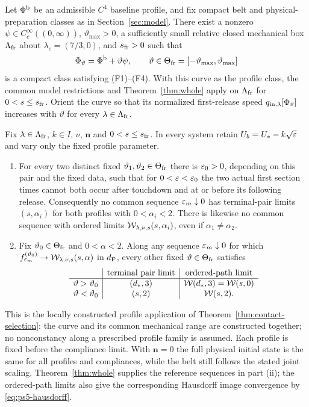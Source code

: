 \begin{corollary}
\label{cor:friction-profile-selection}
Let $\Phi^{\rm b}$ be an admissible $C^4$ baseline profile, and fix
compact belt and physical-preparation classes as in
Section~\ref{sec:model}. There exist a nonzero
$\psi\in C_c^\infty((0,\infty))$, $\vartheta_{\max}>0$, a
sufficiently small relative closed mechanical box $\Lambda_{\rm fr}$
about $\lambda_c=(7/3,0)$, and $s_{\rm fr}>0$ such that
\[
 \Phi_\vartheta=\Phi^{\rm b}+\vartheta\psi,\qquad
 \vartheta\in\Theta_{\rm fr}
              =[-\vartheta_{\max},\vartheta_{\max}]
\]
is a compact class satisfying (F1)--(F4). With this curve as the
profile class, the common model restrictions and
Theorem~\ref{thm:whole} apply on $\Lambda_{\rm fr}$ for
$0<s\le s_{\rm fr}$. Orient the curve so that its normalized
first-release speed $q_{\rm in,\lambda}[\Phi_\vartheta]$ increases with
$\vartheta$ for every $\lambda\in\Lambda_{\rm fr}$.

Fix $\lambda\in\Lambda_{\rm fr}$, $k\in I$, $\nu$, $\mathbf n$
and $0<s\le s_{\rm fr}$. In every system retain
$U_b=U_*-k\sqrt{\varepsilon}$ and vary only the fixed profile parameter.
\begin{enumerate}[label=\textup{(\roman*)},leftmargin=*]
\item For every two distinct fixed
$\vartheta_1,\vartheta_2\in\Theta_{\rm fr}$
there is $\varepsilon_0>0$, depending on this pair and the fixed data,
such that for $0<\varepsilon<\varepsilon_0$ the two actual first section times
cannot both occur after touchdown and at or before its following
release. Consequently no common sequence $\varepsilon_m\downarrow0$
has terminal-pair limits $(s,\alpha_i)$ for both profiles with
$0<\alpha_i<2$. There is likewise no common sequence with ordered
limits $\mathcal W_{\lambda,\nu,s}(s,\alpha_i)$, even if
$\alpha_1\ne\alpha_2$.
\item Fix $\vartheta_0\in\Theta_{\rm fr}$ and $0<\alpha<2$.
Along any sequence $\varepsilon_m\downarrow0$ for which
$f_{\varepsilon_m}^{(\vartheta_0)}\to\mathcal W_{\lambda,\nu,s}(s,\alpha)$
in $d_{\mathrm F}$, every other fixed $\vartheta\in\Theta_{\rm fr}$ satisfies
\[
\begin{array}{c|c|c}
 &\text{terminal pair limit}&\text{ordered-path limit}\\ \hline
 \vartheta>\vartheta_0 &(d_*,3)&\mathcal W(d_*,3)=\mathcal W(s,0)\\
 \vartheta<\vartheta_0 &(s,2)&\mathcal W(s,2).
\end{array}
\]
\end{enumerate}
\end{corollary}

This is the locally constructed profile application of
Theorem~\ref{thm:contact-selection}: the curve and its common
mechanical range are constructed together;
no nonconstancy along a prescribed profile family is assumed.
Each profile is fixed before the compliance limit. With
$\mathbf n=0$ the full physical initial state is the same for all
profiles and compliances, while the belt still follows the stated
joint scaling. Theorem~\ref{thm:whole} supplies the reference
sequences in part \textup{(ii)}; the ordered-path limits also give
the corresponding Hausdorff image convergence by
\eqref{eq:ps5-hausdorff}.

